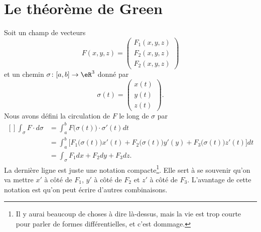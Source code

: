 
\section{Le théorème de Green}

Soit un champ de vecteurs
\begin{equation}
	F(x,y,z)=\begin{pmatrix}
		F_1(x,y,z) \\
		F_2(x,y,z) \\
		F_2(x,y,z)
	\end{pmatrix}
\end{equation}
et un chemin \( \sigma\colon \mathopen[ a , b \mathclose]\to \eR^3\) donné par
\begin{equation}
	\sigma(t)=\begin{pmatrix}
		x(t) \\
		y(t) \\
		z(t)
	\end{pmatrix}.
\end{equation}
Nous avons défini la circulation de \( F\) le long de \( \sigma\) par
\begin{equation}
	\begin{aligned}[]
		\int_{\sigma}F\cdot d\sigma & =\int_a^bF\big( \sigma(t) \big)\cdot\sigma'(t)dt                                                                \\
		                            & =\int_a^b\Big[ F_1\big( \sigma(t) \big)x'(t)+F_2\big( \sigma(t) \big)y'(y)+F_3\big( \sigma(t) \big)z'(t)\Big]dt \\
		                            & =\int_{\sigma} F_1dx +F_2dy+F_3dz.
	\end{aligned}
\end{equation}
La dernière ligne est juste une notation compacte\footnote{Il y aurai beaucoup de choses à dire là-dessus, mais la vie est trop courte pour parler de formes différentielles, et c'est dommage.}. Elle sert à se souvenir qu'on va mettre \( x'\) à côté de \( F_1\), \( y'\) à côté de \( F_2\) et \( z'\) à côté de \( F_3\). L'avantage de cette notation est qu'on peut écrire d'autres combinaisons.

